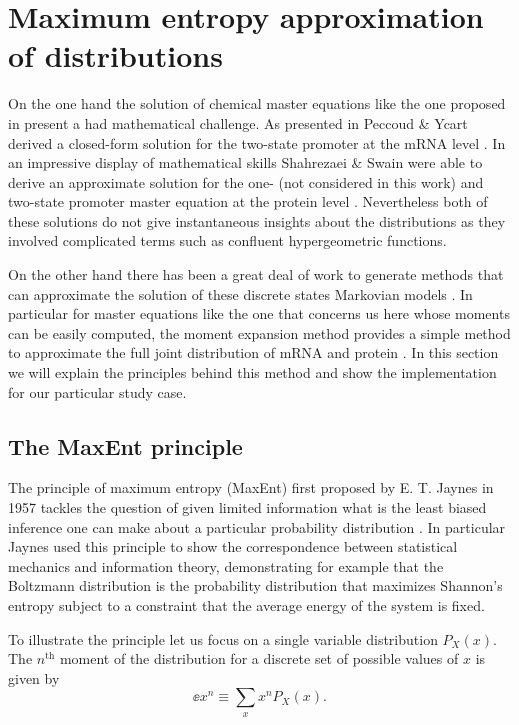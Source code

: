 \section{Maximum entropy approximation of distributions}

On the one hand the solution of chemical master equations like the one proposed
in  present a had mathematical challenge. As presented in
 Peccoud \& Ycart derived a closed-form solution for
the two-state promoter at the mRNA level \cite{Peccoud1995}. In an impressive
display of mathematical skills Shahrezaei \& Swain were able to derive an
approximate solution for the one- (not considered in this work) and two-state
promoter master equation at the protein level \cite{Shahrezaei2008}.
Nevertheless both of these solutions do not give instantaneous insights about
the distributions as they involved complicated terms such as confluent
hypergeometric functions.

On the other hand there has been a great deal of work to generate methods that
can approximate the solution of these discrete states Markovian models
\cite{Ale2013, Andreychenko2017, Frohlich2016, Schnoerr2017, Smadbeck2013,
Hasenauer2014, Dinh2016}. In particular for master equations like the one that
concerns us here whose moments can be easily computed, the moment expansion
method provides a simple method to approximate the full joint distribution of
mRNA and protein \cite{Smadbeck2013}. In this section we will explain the
principles behind this method and show the implementation for our particular
study case.

\subsection{The MaxEnt principle}

The principle of maximum entropy (MaxEnt) first proposed by E. T. Jaynes in 1957
tackles the question of given limited information what is the least biased
inference one can make about a particular probability distribution
\cite{Jaynes1957}. In particular Jaynes used this principle to show the
correspondence between statistical mechanics and information theory,
demonstrating for example that the Boltzmann distribution is the probability
distribution that maximizes Shannon's entropy subject to a constraint that the
average energy of the system is fixed.

To illustrate the principle let us focus on a single variable distribution
$P_X(x)$. The $n^{\text{th}}$ moment of the distribution for a discrete set of
possible values of $x$ is given by
\begin{equation}
  \ee{x^n} \equiv \sum_x x^n P_X(x).
  \label{eq_mom_ref}
\end{equation}

